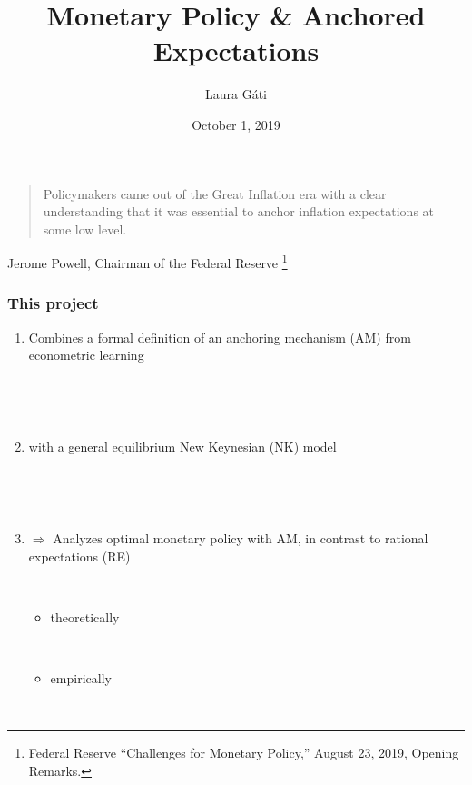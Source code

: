 \documentclass{beamer}
\author[]{Laura G\'ati}
\institute[]{Boston College}
\title[]{Monetary Policy \& Anchored Expectations}
\date[]{October 1, 2019}
\begin{document}
\begin{frame}

\maketitle


\end{frame}


\begin{frame}
	\frametitle{}

\begin{quote}
Policymakers came out of the Great Inflation era with a clear understanding that it was essential to anchor inflation expectations at some low level. \\
\end{quote}

\hspace{1cm} Jerome Powell, Chairman of the Federal Reserve \footnote{Federal Reserve ``Challenges for Monetary Policy,''  August 23, 2019, Opening Remarks.}


\end{frame}


\begin{frame}
	\frametitle{This project}
	
	\begin{enumerate}
	\item Combines a formal definition of an anchoring mechanism (AM) from econometric learning 
	
	\
	
	\
	
	\item with a general equilibrium New Keynesian (NK) model
	
	\
	
	\
	
	\item[] $\Rightarrow$ Analyzes optimal monetary policy with AM, in contrast to rational expectations (RE) 
	
	\
	
	\begin{itemize}
	\item theoretically
	
	\
	
	\item empirically
	\end{itemize}

	
	\
	
	\end{enumerate}


\end{frame}
\end{document}

